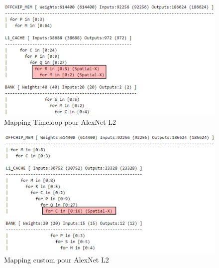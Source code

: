 \documentclass[10pt,letterpaper]{article}
\begin{document}
    \begin{figure}[H]
        \centering
        \includegraphics[width=0.9\linewidth]{map_timeloop_alex_L2.png}
        \caption{Mapping Timeloop pour AlexNet L2}
        \label{fig:map_timeloop_alex_L2}
    \end{figure}

    \begin{figure}[H]
        \centering
        \includegraphics[width=0.9\linewidth]{map_custom_alex_L2.png}
        \caption{Mapping custom pour AlexNet L2}
        \label{fig:map_custom_alex_L2}
    \end{figure}
\end{document}
